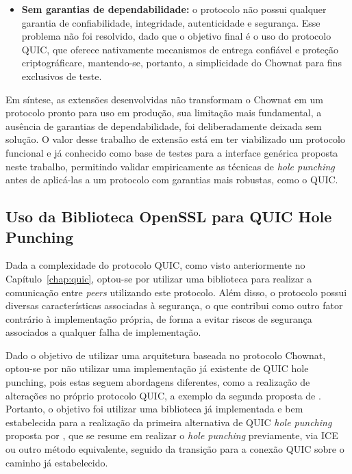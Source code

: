 \begin{itemize}
    \item \textbf{Sem garantias de dependabilidade:} o protocolo não possui qualquer garantia de confiabilidade, integridade, autenticidade e segurança. Esse problema não foi resolvido, dado que o objetivo final é o uso do protocolo QUIC, que oferece nativamente mecanismos de entrega confiável e proteção criptográficare, mantendo-se, portanto, a simplicidade do Chownat para fins exclusivos de teste.
\end{itemize}

Em síntese, as extensões desenvolvidas não transformam o Chownat em um protocolo pronto para uso em produção, sua limitação mais fundamental, a ausência de garantias de dependabilidade, foi deliberadamente deixada sem solução. O valor desse trabalho de extensão está em ter viabilizado um protocolo funcional e já conhecido como base de testes para a interface genérica proposta neste trabalho, permitindo validar empiricamente as técnicas de \textit{hole punching} antes de aplicá-las a um protocolo com garantias mais robustas, como o QUIC.

\subsection{Uso da Biblioteca OpenSSL para QUIC Hole Punching}
\label{sec:ossl_quic_for_hole_punching}

Dada a complexidade do protocolo QUIC, como visto anteriormente no Capítulo~\ref{chap:quic}, optou-se por utilizar uma biblioteca para realizar a comunicação entre \textit{peers} utilizando este protocolo. Além disso, o protocolo possui diversas características associadas à segurança, o que contribui como outro fator contrário à implementação própria, de forma a evitar riscos de segurança associados a qualquer falha de implementação.

Dado o objetivo de utilizar uma arquitetura baseada no protocolo Chownat, optou-se por não utilizar uma implementação já existente de QUIC hole punching, pois estas seguem abordagens diferentes, como a realização de alterações no próprio protocolo QUIC, a exemplo da segunda proposta de \citep{draft-seemann-quic-nat-traversal}. Portanto, o objetivo foi utilizar uma biblioteca já implementada e bem estabelecida para a realização da primeira alternativa de QUIC \textit{hole punching} proposta por \citep{draft-seemann-quic-nat-traversal}, que se resume em realizar o \textit{hole punching} previamente, via ICE ou outro método equivalente, seguido da transição para a conexão QUIC sobre o caminho já estabelecido.

